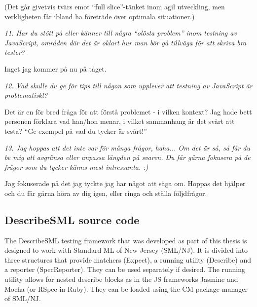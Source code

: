 \documentclass[11pt]{article}
\begin{document}
(Det går givetvis tvärs emot ``full slice''-tänket inom agil utveckling,
men verkligheten får ibland ha företräde över optimala situationer.)

\emph{11. Har du stött på eller känner till några ``olösta problem'' inom testning
av JavaScript, områden där det är oklart hur man bör gå tillväga för
att skriva bra tester?}

Inget jag kommer på nu på tåget.

\emph{12. Vad skulle du ge för tips till någon som upplever att testning av
JavaScript är problematiskt?}

Det är en för bred fråga för att förstå problemet - i vilken kontext?
Jag hade bett personen förklara vad han/hon menar, i vilket sammanhang
är det svårt att testa? ``Ge exempel på vad du tycker är svårt!''

\emph{13. Jag hoppas att det inte var för många frågor, haha... Om det är så, så
får du be mig att avgränsa eller anpassa längden på svaren. Du får
gärna fokusera på de frågor som du tycker känns mest intressanta. :)}

Jag fokuserade på det jag tyckte jag har något att säga om. Hoppas det
hjälper och du får gärna höra av dig igen, eller ringa och ställa
följdfrågor.

\subsection*{DescribeSML source code}

The DescribeSML testing framework that was developed as part of this thesis is designed to work with Standard ML of New Jersey (SML/NJ). It is divided into three structures that provide matchers (Expect), a running utility (Describe) and a reporter (SpecReporter). They can be used separately if desired. The running utility allows for nested describe blocks as in the JS frameworks Jasmine and Mocha (or RSpec in Ruby). They can be loaded using the CM package manager of SML/NJ.


\end{document}
